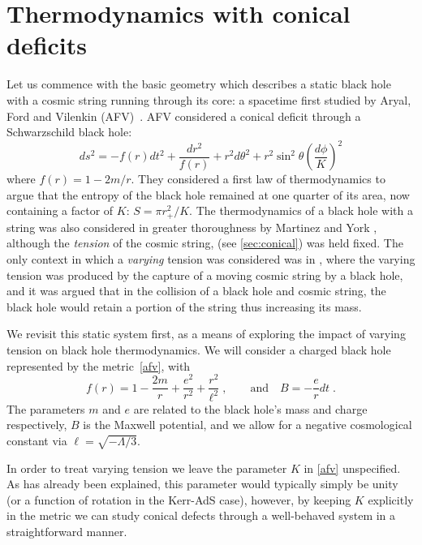 \documentclass[
twoside,
openright,
frontopenright,
]{dmathesis}
\begin{document}
\section{Thermodynamics with conical deficits}\label{sec:singlemu}

Let us commence with the basic geometry which describes a static black hole with
a cosmic string running through its core: a spacetime first studied by Aryal,
Ford and Vilenkin (AFV)~\cite{Aryal:1986sz}. AFV considered a conical deficit
through a Schwarzschild black hole:
\begin{equation}
ds^2 = - f(r) dt^2 + \frac{dr^2}{f(r)} + r^2 d\theta^2
+ r^2 \sin^2\theta \left (\frac{d\phi}{K}\right ) ^2
\label{afv}
\end{equation}
where $f(r) = 1 -2m/r$. They considered a first law of thermodynamics to argue
that the entropy of the black hole remained at one quarter of its area, now
containing a factor of $K$: $S = \pi r_+^2/K$. The thermodynamics of a black
hole with a string was also considered in greater thoroughness by Martinez and
York \cite{Martinez:1990sd}, although the \emph{tension} of the cosmic string,
(see \cref{sec:conical}) was held fixed. The only context in which a
\emph{varying} tension was considered was in \cite{Bonjour:1998rf}, where the
varying tension was produced by the capture of a moving cosmic string by a black
hole, and it was argued that in the collision of a black hole and cosmic string,
the black hole would retain a portion of the string thus increasing its mass.

We revisit this static system first, as a means of exploring the impact of
varying tension on black hole thermodynamics. We will consider a charged black
hole represented by the metric~\eqref{afv}, with
\begin{equation}
f(r) = 1-\frac{2m}{r} + \frac{e^{2}}{r^{2}} + \frac{r^{2}}{\ell^2}\;, \qquad
\text{and} \quad {B} = - \frac{e}{r} dt\;.
\end{equation}
The parameters $m$ and $e$ are related to the black hole's mass and charge
respectively, $B$ is the Maxwell potential, and we allow for a negative
cosmological constant via $\ell = \sqrt{-\Lambda/3}$.

In order to treat varying tension we leave the parameter $K$ in \cref{afv}
unspecified. As has already been explained, this parameter would typically
simply be unity (or a function of rotation in the Kerr-AdS case), however, by
keeping $K$ explicitly in the metric we can study conical defects through a
well-behaved system in a straightforward manner.
\end{document}

